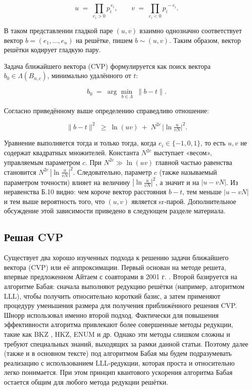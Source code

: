 \begin{equation}
  u \;=\; \prod_{e_{i}>0} p_{i}^{\,e_{i}},
  \qquad
  v \;=\; \prod_{e_{i}<0} p_{i}^{\,-e_{i}}.
\end{equation}

В таком представлении гладкой паре $(u,v)$ взаимно однозначно соответствует
вектор $b=(e_{1},\dots,e_{n})$ на решётке, пишем $b\sim(u,v)$. Таким образом,
вектор решётки кодирует гладкую пару.

Задача ближайшего вектора (CVP) формулируется как поиск вектора
$b_{0}\in\Lambda(B_{n,c})$, минимально удалённого от $t$:

\begin{equation}
    b_{0} \;=\; \arg\min_{\,b\in\Lambda}\;\lVert b - t\rVert.
\end{equation}

Согласно приведённому выше определению справедливо отношение:

\begin{equation}
  \lVert b - t\rVert^{2}
  \;\ge\;
  \ln(uv) \;+\; N^{2c}\,\bigl|\ln\tfrac{u}{vN}\bigr|^{2}.
\end{equation}

Уравнение выполняется тогда и только тогда, когда $e_{i}\in\{-1,0,1\}$, то есть
$u,v$ не содержат квадратных множителей. Константа $N^{2c}$ выступает «весом»,
управляемым параметром $c$. При $N^{2c}\gg\ln(uv)$ главной частью равенства
становится $N^{2c}\,|\ln\frac{u}{vN}|^{2}$. Следовательно, параметр $c$ (также
называемый параметром точности) влияет на величину $|\ln\frac{u}{vN}|^{2}$, а
значит и на $|u-vN|$. Из неравенства Б.10 видно: чем короче вектор расстояния
$b-t$, тем меньше $|u-vN|$ и тем выше вероятность того, что $(u,v)$ является
sr‑парой. Дополнительное обсуждение этой зависимости приведено в следующем
разделе материала.

\subsection*{Решая CVP}

Существует два хорошо изученных подхода к решению задачи ближайшего вектора
(CVP) или её аппроксимации. Первый основан на методе решета, впервые
предложенном Айтаем с соавторами в 2001 г. \cite{cite_36}. Второй базируется на
алгоритме Бабая: сначала выполняют редукцию решётки (например, алгоритмом LLL),
чтобы получить относительно короткий базис, а затем применяют процедуру
уменьшения размера для получения приближённого решения CVP. Шнорр использовал
именно второй подход. Фактически для повышения эффективности алгоритма
привлекают более совершенные методы редукции, такие как BKZ \cite{cite_37},
HKZ, ENUM \cite{cite_37,cite_38,cite_39,cite_40} и др. Однако эти методы
слишком сложны и требуют специальных знаний, выходящих за рамки данной статьи.
Поэтому далее (также и в основном тексте) под алгоритмом Бабая мы будем
подразумевать реализацию с использованием LLL‑редукции, которая проста и
относительно легко понимается. При этом принцип квантового ускорения алгоритма
Бабая остается общим для любого метода редукции решётки.
